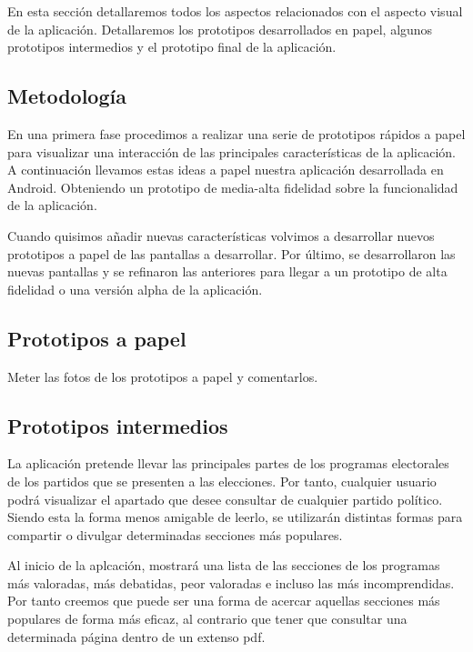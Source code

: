 En esta sección detallaremos todos los aspectos relacionados con el aspecto visual de la aplicación. Detallaremos los prototipos desarrollados en papel, algunos prototipos intermedios y el prototipo final de la aplicación.

\subsection{Metodología}

En una primera fase procedimos a realizar una serie de prototipos rápidos a papel para visualizar una interacción de las principales características de la aplicación. A continuación llevamos estas ideas a papel nuestra aplicación desarrollada en Android. Obteniendo un prototipo de media-alta fidelidad sobre la funcionalidad de la aplicación.

Cuando quisimos añadir nuevas características volvimos a desarrollar nuevos prototipos a papel de las pantallas a desarrollar. Por último, se desarrollaron las nuevas pantallas y se refinaron las anteriores para llegar a un prototipo de alta fidelidad o una versión alpha de la aplicación.

\subsection{Prototipos a papel}

Meter las fotos de los prototipos a papel y comentarlos.

\subsection{Prototipos intermedios}

La aplicación pretende llevar las principales partes de los programas electorales de los partidos que se presenten a las elecciones. Por tanto, cualquier usuario podrá visualizar el apartado que desee consultar de cualquier partido político. Siendo esta la forma menos amigable de leerlo, se utilizarán distintas formas para compartir o divulgar determinadas secciones más populares.

Al inicio de la aplcación, mostrará una lista de las secciones de los programas más valoradas, más debatidas, peor valoradas e incluso las más incomprendidas. Por tanto creemos que puede ser una forma de acercar aquellas secciones más populares de forma más eficaz, al contrario que tener que consultar una determinada página dentro de un extenso pdf.

